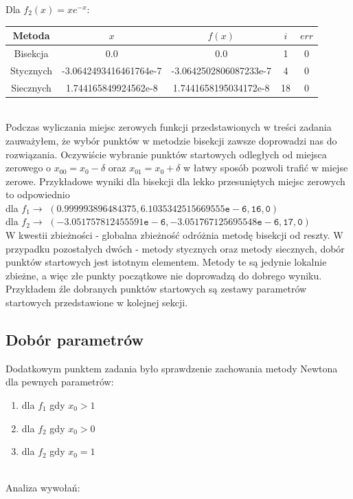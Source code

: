 \begin{center} 
Dla $f_2(x) = xe^{-x}$: \\
\end{center}

\begin{center}
  \begin{tabular}{|c|c|c|c|c|}
    \hline 
      Metoda & $x$ & $ f(x)$ & $i$ & $err$ \\
    \hline
    Bisekcja & 0.0 & 0.0 & 1 & 0\\
    \hline 
    Stycznych & -3.0642493416461764e-7 & -3.0642502806087233e-7 & 4 & 0\\
    \hline  
    Siecznych & 1.744165849924562e-8 & 1.7441658195034172e-8 & 18 & 0 \\
    \hline
  \end{tabular} 
\end{center}

\ \\
Podczas wyliczania miejsc zerowych funkcji przedstawionych w treści zadania zauważyłem, że wybór punktów w metodzie bisekcji zawsze doprowadzi nas do rozwiązania. Oczywiście wybranie punktów startowych odległych od miejsca zerowego o $ x_{00} = x_0 - \delta $ oraz $ x_{01} = x_0 + \delta $ w łatwy sposób pozwoli trafić w miejse zerowe. Przykładowe wyniki dla bisekcji dla lekko przesuniętych miejsc zerowych to odpowiednio \\dla $f_1 \rightarrow$ $ \mathtt{(0.999993896484375, 6.1035342515669555e-6, 16, 0)} $ \\dla $ f_2 \rightarrow $ $ \mathtt{(-3.051757812455591e-6, -3.051767125695548e-6, 17, 0)}$ \\ W kwestii zbieżności - globalna zbieżność odróżnia metodę bisekcji od reszty. W przypadku pozostałych dwóch - metody stycznych oraz metody siecznych, dobór punktów startowych jest istotnym elementem. Metody te są jedynie lokalnie zbieżne, a więc złe punkty początkowe nie doprowadzą do dobrego wyniku. Przykładem źle dobranych punktów startowych są zestawy parametrów startowych przedstawione w kolejnej sekcji.

\subsection{Dobór parametrów}

Dodatkowym punktem zadania było sprawdzenie zachowania metody Newtona dla pewnych parametrów:

\begin{enumerate}
  \item dla $ f_1 $ gdy $ x_0 > 1 $
  \item dla $ f_2 $ gdy $ x_0 > 0 $
  \item dla $ f_2 $ gdy $ x_0 = 1$
  
\end{enumerate}
\ \\
Analiza wywołań:


